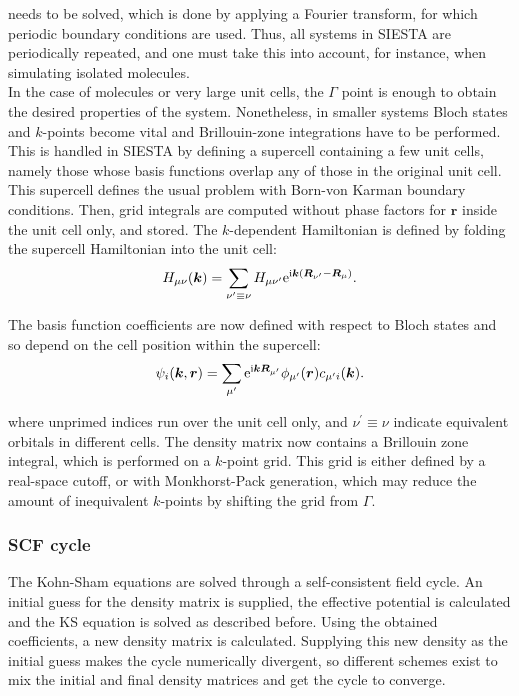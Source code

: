 needs to be solved, which is done by applying a Fourier transform, for which periodic boundary conditions are used\parencite{Soler2002}. Thus, all systems in SIESTA are periodically repeated, and one must take this into account, for instance, when simulating isolated molecules.\\

In the case of molecules or very large unit cells, the \(\Gamma\) point is enough to obtain the desired properties of the system. Nonetheless, in smaller systems Bloch states and \(k\)-points become vital and Brillouin-zone integrations have to be performed. This is handled in SIESTA by defining a supercell containing a few unit cells, namely those whose basis functions overlap any of those in the original unit cell. This supercell defines the usual problem with Born-von Karman boundary conditions. Then, grid integrals are computed without phase factors for \(\bm r\) inside the unit cell only, and stored. The \(k\)-dependent Hamiltonian is defined by folding the supercell Hamiltonian into the unit cell\parencite{Papior2016,Soler2002}:
\begin{equation}
	H_{\mu \nu}(\bm{k})=\sum_{\nu^{\prime} \equiv \nu} H_{\mu \nu^{\prime}} \mathrm{e}^{\mathrm{i} \bm{k}\left(\bm{R}_{\nu^{\prime}}-\bm{R}_{\mu}\right)}.
\end{equation}

The basis function coefficients are now defined with respect to Bloch states and so depend on the cell position within the supercell:
\begin{equation}
\psi_{i}(\bm{k}, \bm{r})=\sum_{\mu^{\prime}} \mathrm{e}^{\mathrm{i} \bm{k} \bm{R}_{\mu^{\prime}}} \phi_{\mu^{\prime}}(\bm{r}) c_{\mu^{\prime} i}(\bm{k}).
\end{equation}

where unprimed indices run over the unit cell only, and \(\nu^{\prime} \equiv \nu\) indicate equivalent orbitals in different cells. The density matrix now contains a Brillouin zone integral, which is performed on a \(k\)-point grid. This grid is either defined by a real-space cutoff, or with Monkhorst-Pack\parencite{Monkhorst1976} generation, which may reduce the amount of inequivalent \(k\)-points by shifting the grid from \(\Gamma\).



\subsubsection*{SCF cycle}
The Kohn-Sham equations are solved through a self-consistent field cycle. An initial guess for the density matrix is supplied, the effective potential is calculated and the KS equation is solved as described before. Using the obtained coefficients, a new density matrix is calculated. Supplying this new density as the initial guess makes the cycle numerically divergent, so different schemes exist to mix the initial and final density matrices and get the cycle to converge.\\

